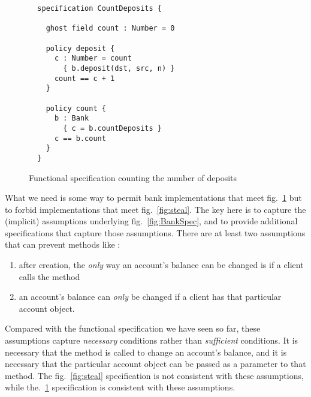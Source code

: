 \begin{figure}[tbp]
\begin{lstlisting}
  specification CountDeposits {

    ghost field count : Number = 0

    policy deposit {
      c : Number = count
        { b.deposit(dst, src, n) }
      count == c + 1
    }

    policy count {
      b : Bank
        { c = b.countDeposits }
      c == b.count
    }
  }
\end{lstlisting}
\caption{Functional specification counting the number of deposits}
\label{fig:count}
\end{figure}


What we need is some way to permit bank implementations that meet
fig.~\ref{fig:count} but to forbid implementations that meet fig.~\ref{fig:steal}.  
The key here is to capture the (implicit)
assumptions underlying fig.~\ref{fig:BankSpec}, and to provide
additional specifications that capture those assumptions.  There are
at least two assumptions that can prevent methods like :

\begin{enumerate}
\item after creation, the \emph{only} way an account's
  balance can be changed is if a client   calls the  method  
\item an account's balance can \emph{only} be changed if a client has
  that particular account object.
\end{enumerate}

Compared with the functional specification we have seen so far, these
assumptions capture \emph{necessary} conditions rather than
\emph{sufficient} conditions. It is necessary that the 
method is called to change an account's balance, and it is necessary
that the particular account object can be passed as a parameter to
that method. The fig.~\ref{fig:steal} specification is not consistent
with these assumptions, while the.~\ref{fig:count} specification is
consistent with these assumptions.

{}
{}

